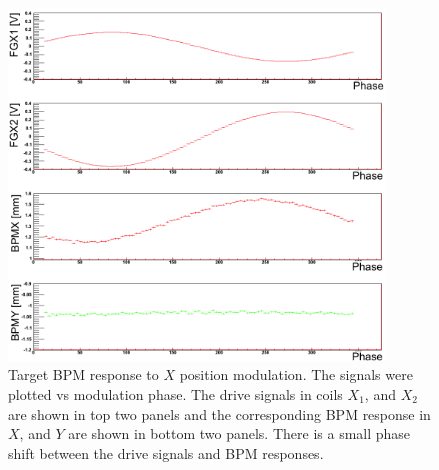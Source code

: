 \begin{singlespace}
\begin{figure}[!h]
	\begin{center}
	\includegraphics[width=10.0cm]{figures/BModBPMResponse}
	\end{center}
	\caption
	{Target BPM response to $X$ position modulation. The signals were plotted vs modulation phase. The drive signals in coils $X_{1}$, and $X_{2}$ are shown in top two panels and the corresponding BPM response in $X$, and $Y$ are shown in bottom two panels. There is a small phase shift between the drive signals and BPM responses.}
	\label{fig:BModBPMResponse}
\end{figure}
\end{singlespace}

